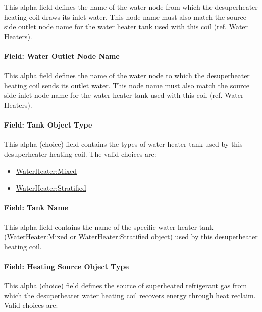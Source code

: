 This alpha field defines the name of the water node from which the desuperheater heating coil draws its inlet water. This node name must also match the source side outlet node name for the water heater tank used with this coil (ref. Water Heaters).

\paragraph{Field: Water Outlet Node Name}\label{field-water-outlet-node-name-4-000}

This alpha field defines the name of the water node to which the desuperheater heating coil sends its outlet water. This node name must also match the source side inlet node name for the water heater tank used with this coil (ref. Water Heaters).

\paragraph{Field: Tank Object Type}\label{field-tank-object-type}

This alpha (choice) field contains the types of water heater tank used by this desuperheater heating coil. The valid choices are:
\begin{itemize}
\item
 \hyperref[waterheatermixed]{WaterHeater:Mixed}
\item
 \hyperref[waterheaterstratified]{WaterHeater:Stratified}
\end{itemize}

\paragraph{Field: Tank Name}\label{field-tank-name}

This alpha field contains the name of the specific water heater tank (\hyperref[waterheatermixed]{WaterHeater:Mixed} or \hyperref[waterheaterstratified]{WaterHeater:Stratified} object) used by this desuperheater heating coil.

\paragraph{Field: Heating Source Object Type}\label{field-heating-source-object-type-1}

This alpha (choice) field defines the source of superheated refrigerant gas from which the desuperheater water heating coil recovers energy through heat reclaim. Valid choices are:

